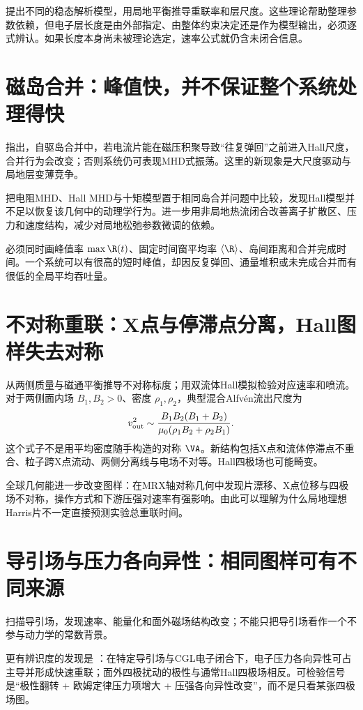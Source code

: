 \citet{Simakov2008,Malyshkin2008,Malyshkin2009}提出不同的稳态解析模型，用局地平衡推导重联率和层尺度。这些理论帮助整理参数依赖，但电子层长度是由外部指定、由整体约束决定还是作为模型输出，必须逐式辨认。如果长度本身尚未被理论选定，速率公式就仍含未闭合信息。

\section{磁岛合并：峰值快，并不保证整个系统处理得快}
\citet{Knoll2006}指出，自驱岛合并中，若电流片能在磁压积聚导致“往复弹回”之前进入Hall尺度，合并行为会改变；否则系统仍可表现MHD式振荡。这里的新现象是大尺度驱动与局地层变薄竞争。

\citet{Ng2015}把电阻MHD、Hall MHD与十矩模型置于相同岛合并问题中比较，发现Hall模型并不足以恢复该几何中的动理学行为。\citet{Ng2017}进一步用非局地热流闭合改善离子扩散区、压力和速度结构，减少对局地松弛参数微调的依赖。

必须同时画峰值率 $\max\R(t)$、固定时间窗平均率 $\langle\R\rangle$、岛间距离和合并完成时间。一个系统可以有很高的短时峰值，却因反复弹回、通量堆积或未完成合并而有很低的全局平均吞吐量。

\section{不对称重联：X点与停滞点分离，Hall图样失去对称}
\citet{Cassak2007}从两侧质量与磁通平衡推导不对称标度；\citet{Cassak2008}用双流体Hall模拟检验对应速率和喷流。对于两侧面内场 $B_1,B_2>0$、密度 $\rho_1,\rho_2$，典型混合Alfvén流出尺度为
\begin{equation}v_{\rm out}^2\sim{B_1B_2(B_1+B_2)\over\mu_0(\rho_1B_2+\rho_2B_1)}.
\end{equation}
这个式子不是用平均密度随手构造的对称 $\VA$。新结构包括X点和流体停滞点不重合、粒子跨X点流动、两侧分离线与电场不对等。Hall四极场也可能畸变。

全球几何能进一步改变图样：\citet{Dorfman2008}在MRX轴对称几何中发现片漂移、X点位移与四极场不对称，操作方式和下游压强对速率有强影响。由此可以理解为什么局地理想Harris片不一定直接预测实验总重联时间。

\section{导引场与压力各向异性：相同图样可有不同来源}
\citet{HubaGuide2004}扫描导引场，发现速率、能量化和面外磁场结构改变；不能只把导引场看作一个不参与动力学的常数背景。

更有辨识度的发现是 \citet{Cassak2015}：在特定导引场与CGL电子闭合下，电子压力各向异性可占主导并形成快速重联；面外四极扰动的极性与通常Hall四极场相反。可检验信号是“极性翻转 + 欧姆定律压力项增大 + 压强各向异性改变”，而不是只看某张四极场图。

